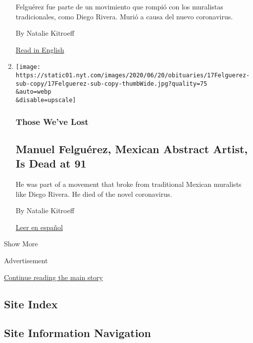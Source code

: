 \begin{enumerate}
  Felguérez fue parte de un movimiento que rompió con los muralistas
  tradicionales, como Diego Rivera. Murió a causa del nuevo coronavirus.

  By Natalie Kitroeff

  \href{https://www.nytimes.com/2020/06/17/arts/manuel-felguerez-dead-coronavirus.html}{Read
  in English}
\item
  \href{/2020/06/17/arts/manuel-felguerez-dead-coronavirus.html}{}

  \texttt{[image: https://static01.nyt.com/images/2020/06/20/obituaries/17Felguerez-sub-copy/17Felguerez-sub-copy-thumbWide.jpg?quality=75\\\&auto=webp\\\&disable=upscale]}

  \hypertarget{those-weve-lost}{%
  \subsubsection{Those We've Lost}\label{those-weve-lost}}

  \hypertarget{manuel-felguuxe9rez-mexican-abstract-artist-is-dead-at-91}{%
  \subsection{Manuel Felguérez, Mexican Abstract Artist, Is Dead at
  91}\label{manuel-felguuxe9rez-mexican-abstract-artist-is-dead-at-91}}

  He was part of a movement that broke from traditional Mexican
  muralists like Diego Rivera. He died of the novel coronavirus.

  By Natalie Kitroeff

  \href{https://www.nytimes.com/es/2020/06/18/espanol/cultura/muere-covid-manuel-felguerez.html}{Leer
  en español}
\end{enumerate}

Show More

Advertisement

\protect\hyperlink{after-mid2}{Continue reading the main story}

\hypertarget{site-index}{%
\subsection{Site Index}\label{site-index}}

\hypertarget{site-information-navigation}{%
\subsection{Site Information
Navigation}\label{site-information-navigation}}

